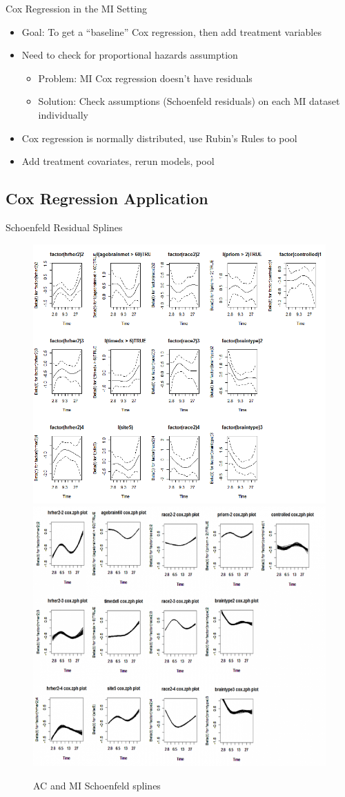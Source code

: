 \begin{frame}{Cox Regression in the MI Setting}
\begin{itemize}
 \item Goal: To get a ``baseline'' Cox regression, then add treatment variables
 \item Need to check for proportional hazards assumption
 \begin{itemize}
  \item Problem:  MI Cox regression doesn't have residuals
  \item Solution: Check assumptions (Schoenfeld residuals) on each MI dataset individually
 \end{itemize}
\item Cox regression is normally distributed, use Rubin's Rules to pool
\item Add treatment covariates, rerun models, pool
\end{itemize}
\end{frame}

\subsection{Cox Regression Application}
\begin{frame}{Schoenfeld Residual Splines}
\begin{figure}[h!]
  \centering
\includegraphics[width=.5\textwidth]{ac_schoenfeld}%
\includegraphics[width=.5\textwidth]{mi_schoenfeld} 
\caption{AC and MI Schoenfeld splines}
\end{figure}
\end{frame}




